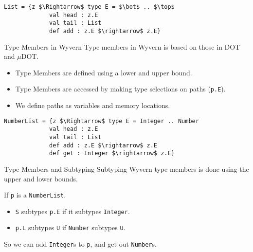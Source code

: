 \documentclass[dvipsnames]{beamer}
\begin{document}
\begin{lrbox}{\tmExWyvern}
\begin{lstlisting}[mathescape, style=customlang]	
List = {z $\Rightarrow$ type E = $\bot$ .. $\top$
             val head : z.E
             val tail : List
             def add : z.E $\rightarrow$ z.E}
\end{lstlisting}
\end{lrbox}

\begin{frame}{Type Members in Wyvern}
Type members in Wyvern is based on those in DOT and $\mu$DOT. 
\begin{itemize}
\item
Type Members are defined using a lower and upper bound.
\item
Type Members are accessed by making type selections on paths (\texttt{p.E}).
\item
We define paths as variables and memory locations.
\end{itemize}
\begin{example}
\usebox{\tmExWyvern}
\end{example}
\end{frame}

\begin{lrbox}{\tmExTMSub}
\begin{lstlisting}[mathescape, style=customlang]	
NumberList = {z $\Rightarrow$ type E = Integer .. Number
             val head : z.E
             val tail : List
             def add : z.E $\rightarrow$ z.E
             def get : Integer $\rightarrow$ z.E}
\end{lstlisting}
\end{lrbox}

\begin{frame}{Type Members and Subtyping}
Subtyping Wyvern type members is done using the upper and lower bounds.
\begin{example}
\usebox{\tmExTMSub}
\end{example}
If \texttt{p} is a \texttt{NumberList}.
\begin{itemize}
\item
\texttt{S} subtypes \texttt{p.E} if it subtypes \texttt{Integer}.
\item
\texttt{p.L} subtypes \texttt{U} if \texttt{Number} subtypes \texttt{U}.
\end{itemize}
So we can add \texttt{Integer}s to \texttt{p}, and get out \texttt{Number}s.
\end{frame}
\end{document}
